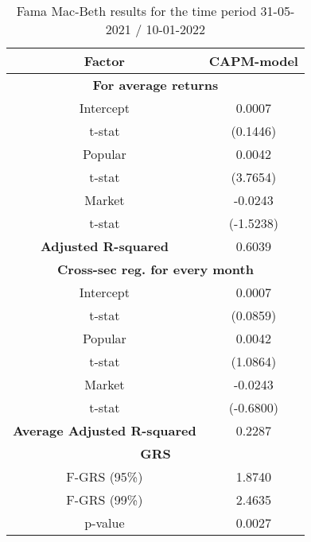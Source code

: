 \begin{table}[h!]
	\centering
	\captionsetup{skip=0.5\baselineskip}
	\caption{Fama Mac-Beth results for the time period 31-05-2021 / 10-01-2022}
	\begin{tabular}{|c|c|}
		\hline
		\textbf{Factor} & \textbf{CAPM-model} \\ \hline
		\multicolumn{2}{|c|}{\textbf{For average returns}} \\ \hline
		Intercept & 0.0007 \\ 
		t-stat & (0.1446) \\ \hline
		Popular & 0.0042 \\ 
		t-stat & (3.7654)\\ \hline
		Market & -0.0243 \\
		t-stat & (-1.5238)\\ \hline
		\textbf{Adjusted R-squared} & 0.6039 \\ \hline
		\multicolumn{2}{|c|}{\textbf{Cross-sec reg. for every month}} \\ \hline
		Intercept & 0.0007 \\ 
		t-stat & (0.0859) \\ \hline
		Popular & 0.0042 \\ 
		t-stat & (1.0864)\\ \hline
		Market & -0.0243 \\
		t-stat & (-0.6800)\\ \hline
		\textbf{Average Adjusted R-squared} & 0.2287 \\ \hline
		\multicolumn{2}{|c|}{\textbf{GRS}} \\ \hline
		F-GRS (95\%) & 1.8740 \\ \hline
		F-GRS (99\%) & 2.4635 \\ \hline
		p-value & 0.0027 \\ \hline
	\end{tabular}
\end{table}

